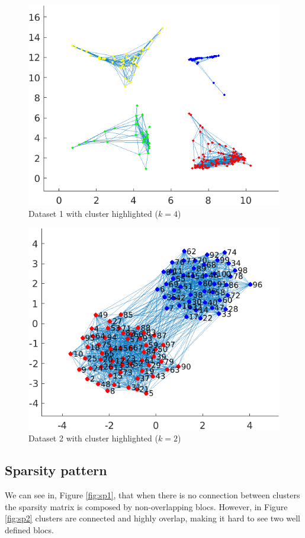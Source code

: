 \documentclass[]{article}
\begin{document}
\begin{figure}[!h]
    \centering
    \includegraphics[width=.8\textwidth]{../example1_clusters.png}
    \caption{Dataset 1 with cluster highlighted ($k=4$)}
    \label{fig:c1}
\end{figure}

\begin{figure}[!h]
    \centering
    \includegraphics[width=.8\textwidth]{../example2_clusters.png}
    \caption{Dataset 2 with cluster highlighted ($k=2$)}
    \label{fig:c2}
\end{figure}

\pagebreak

\subsection{Sparsity pattern}

We can see in, Figure \ref{fig:sp1}, that when there is no connection between clusters the sparsity matrix is composed by non-overlapping blocs. However, in Figure \ref{fig:sp2} clusters are connected and highly overlap, making it hard to see two well defined blocs.
\end{document}
